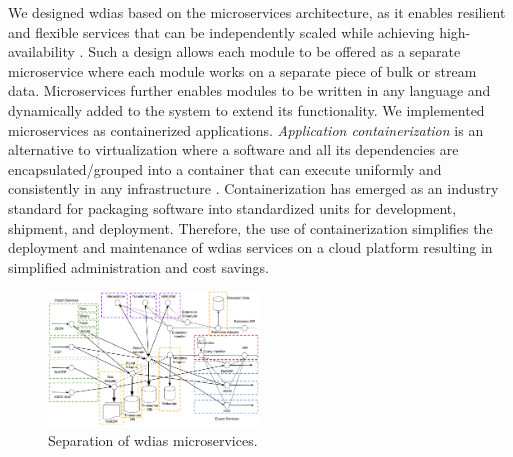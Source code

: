 \documentclass[conference]{IEEEtran}
\begin{document}
We designed \acrshort{wdias} based on the microservices architecture, as it enables resilient and flexible services that can be independently scaled while achieving high-availability \cite{LewisMicroservices}. Such a design allows each module to be offered as a separate microservice where each module works on a separate piece of bulk or stream data. Microservices further enables modules to be written in any language and dynamically added to the system to extend its functionality. We implemented microservices as containerized applications. \emph{Application containerization} is an alternative to virtualization where a software and all its dependencies are encapsulated/grouped into a container that can execute uniformly and consistently in any infrastructure \cite{IBMContainerizationExplained}. Containerization has emerged as an industry standard for packaging software into standardized units for development, shipment, and deployment. Therefore, the use of containerization simplifies the deployment and maintenance of \acrshort{wdias} services on a cloud platform resulting in simplified administration and cost savings.

\begin{figure}[!tb]
\centerline{\includegraphics[width=0.5\textwidth]{images/separation_microservices-p1.pdf}}
\caption{Separation of \acrshort{wdias} microservices.}
\label{pfi:microservice_separation}
\end{figure}
\end{document}
